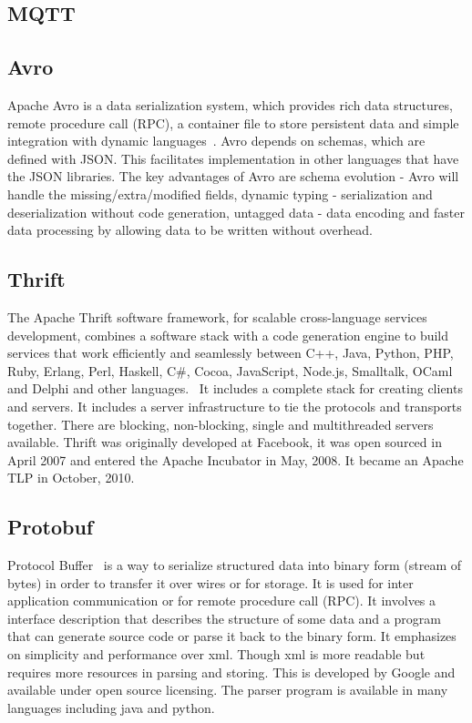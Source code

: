 \subsection{MQTT}

\subsection{Avro}

Apache Avro is a data serialization system, which provides rich data
structures, remote procedure call (RPC), a container file to store
persistent data and simple integration with dynamic
languages~\cite{www-Avro}.  Avro depends on schemas, which are defined
with JSON. This facilitates implementation in other languages that
have the JSON libraries.  The key advantages of Avro are schema
evolution - Avro will handle the missing/extra/modified fields,
dynamic typing - serialization and deserialization without code
generation, untagged data - data encoding and faster data processing
by allowing data to be written without overhead.
     
\subsection{Thrift \cv}

The Apache Thrift software framework, for scalable cross-language
services development, combines a software stack with a code generation
engine to build services that work efficiently and seamlessly between
C++, Java, Python, PHP, Ruby, Erlang, Perl, Haskell, C\#, Cocoa,
JavaScript, Node.js, Smalltalk, OCaml and Delphi and other
languages.~\cite{paper-thrift} It includes a complete stack for
creating clients and servers. It includes a server infrastructure to
tie the protocols and transports together. There are blocking,
non-blocking, single and multithreaded servers available.  Thrift was
originally developed at Facebook, it was open sourced in April 2007
and entered the Apache Incubator in May, 2008. It became an Apache TLP
in October, 2010.~\cite{www-thrift}
     
\subsection{Protobuf \cv}

Protocol Buffer~\cite{www-protobuf} is a way to serialize structured
data into binary form (stream of bytes) in order to transfer it over
wires or for storage. It is used for inter application communication
or for remote procedure call (RPC). It involves a interface
description that describes the structure of some data and a program
that can generate source code or parse it back to the binary form. It
emphasizes on simplicity and performance over xml. Though xml is more
readable but requires more resources in parsing and storing.  This is
developed by Google and available under open source licensing. The
parser program is available in many languages including java and
python.

